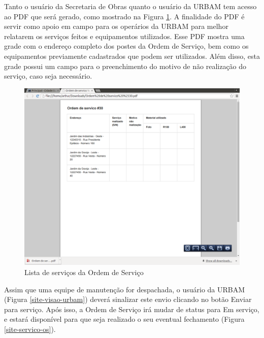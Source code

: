 \documentclass[
	article,			%
	11pt,				%
	oneside,			%
	a4paper,			%
	english,			%
	brazil,				%
	sumario=tradicional
	]{abntex2}
\begin{document}
\clearpage

Tanto o usuário da Secretaria de Obras quanto o usuário da URBAM tem acesso ao PDF que será gerado,
como mostrado na Figura \ref{site-pdf}. A finalidade do PDF é servir como apoio em campo para os
operários da URBAM para melhor relatarem os serviços feitos e equipamentos utilizados.
Esse PDF mostra uma grade com o endereço completo dos postes da Ordem de Serviço, bem como os
equipamentos previamente cadastrados que podem ser utilizados. Além disso, esta grade possui um
campo para o preenchimento do motivo de não realização do serviço, caso seja necessário.

\begin{figure}[!htbp]
 \centering
 \caption{\label{site-pdf}Lista de serviços da Ordem de Serviço}
 \includegraphics[scale=0.25]{site/12-pdf.png}
\end{figure}

\clearpage

Assim que uma equipe de manutenção for despachada, o usuário da URBAM (Figura \ref{site-visao-urbam})
deverá sinalizar este envio clicando no botão Enviar para serviço. Após isso, a Ordem de Serviço irá
mudar de status para Em serviço, e estará disponível para que seja realizado o seu eventual
fechamento (Figura \ref{site-servico-os}).
\end{document}
